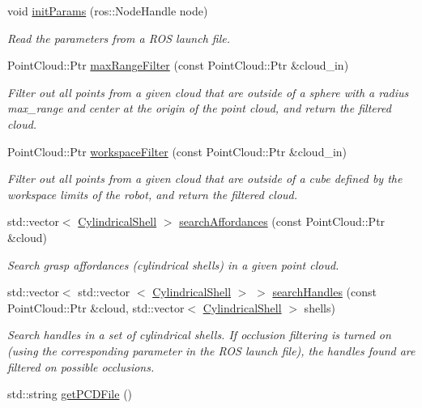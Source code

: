 \begin{DoxyCompactItemize}
\item 
void \hyperlink{class_affordances_a9fb12a782a3912ed4254f3c4e972f278}{init\-Params} (ros\-::\-Node\-Handle node)
\begin{DoxyCompactList}\small\item\em \-Read the parameters from a \-R\-O\-S launch file. \end{DoxyCompactList}\item 
\-Point\-Cloud\-::\-Ptr \hyperlink{class_affordances_ae0304055c3c4a8755c0a002d7ee6e798}{max\-Range\-Filter} (const \-Point\-Cloud\-::\-Ptr \&cloud\-\_\-in)
\begin{DoxyCompactList}\small\item\em \-Filter out all points from a given cloud that are outside of a sphere with a radius max\-\_\-range and center at the origin of the point cloud, and return the filtered cloud. \end{DoxyCompactList}\item 
\-Point\-Cloud\-::\-Ptr \hyperlink{class_affordances_a20975b9d91e56469cbf6dfb410c89039}{workspace\-Filter} (const \-Point\-Cloud\-::\-Ptr \&cloud\-\_\-in)
\begin{DoxyCompactList}\small\item\em \-Filter out all points from a given cloud that are outside of a cube defined by the workspace limits of the robot, and return the filtered cloud. \end{DoxyCompactList}\item 
std\-::vector$<$ \hyperlink{class_cylindrical_shell}{\-Cylindrical\-Shell} $>$ \hyperlink{class_affordances_a86a74ef0cc9e4e627aeec9757599dc11}{search\-Affordances} (const \-Point\-Cloud\-::\-Ptr \&cloud)
\begin{DoxyCompactList}\small\item\em \-Search grasp affordances (cylindrical shells) in a given point cloud. \end{DoxyCompactList}\item 
std\-::vector$<$ std\-::vector\*
$<$ \hyperlink{class_cylindrical_shell}{\-Cylindrical\-Shell} $>$ $>$ \hyperlink{class_affordances_a815e4d41e482279579a515ea09d18e56}{search\-Handles} (const \-Point\-Cloud\-::\-Ptr \&cloud, std\-::vector$<$ \hyperlink{class_cylindrical_shell}{\-Cylindrical\-Shell} $>$ shells)
\begin{DoxyCompactList}\small\item\em \-Search handles in a set of cylindrical shells. \-If occlusion filtering is turned on (using the corresponding parameter in the \-R\-O\-S launch file), the handles found are filtered on possible occlusions. \end{DoxyCompactList}\item 
\hypertarget{class_affordances_afcf209198fd79fa0d0d55629bc728746}{std\-::string \hyperlink{class_affordances_afcf209198fd79fa0d0d55629bc728746}{get\-P\-C\-D\-File} ()}\label{class_affordances_afcf209198fd79fa0d0d55629bc728746}


\end{DoxyCompactItemize}
